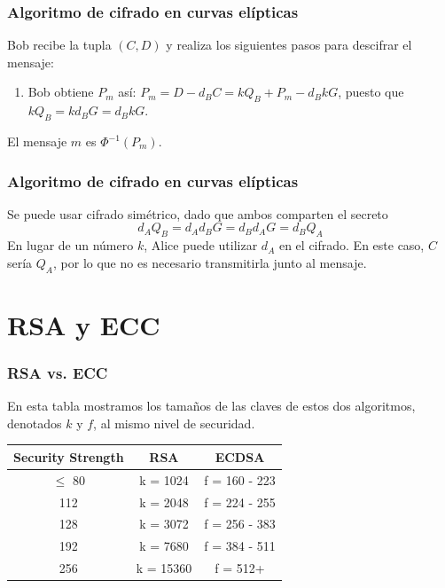 \documentclass[xcolor=x11names,compress,utf8, 9pt]{beamer}
\begin{document}
\begin{frame}\frametitle{Algoritmo de cifrado en curvas elípticas}
Bob recibe la tupla $(C,D)$ y realiza los siguientes pasos para descifrar el mensaje:

\begin{enumerate}
\item Bob obtiene $P_m$ así: $P_m = D - d_BC = kQ_B + P_m - d_BkG$,
puesto que $kQ_B=kd_BG=d_BkG$.
\end{enumerate}

El mensaje $m$ es $\Phi^{-1}(P_m)$.
\end{frame}

\begin{frame}\frametitle{Algoritmo de cifrado en curvas elípticas}
Se puede usar cifrado simétrico, dado que ambos comparten el secreto
$$d_A Q_B=d_A d_B G=d_B d_AG=d_B Q_A$$
En lugar de un número $k$, Alice puede utilizar $d_A$ en el cifrado. En este caso, $C$ sería $Q_A$, por lo que no es necesario transmitirla junto al mensaje.
\end{frame}

\section{RSA y ECC}

\begin{frame}\frametitle{RSA vs. ECC}

En esta tabla mostramos los tamaños de las claves de estos dos algoritmos, denotados $k$ y $f$, al mismo nivel de securidad.
  
  \begin{table}[H]
\centering
\begin{tabular}{|c|c|c|}
\hline
\textbf{Security Strength} & \textbf{RSA} & \textbf{ECDSA} \\ \hline
$\leq$ 80                  & k = 1024       & f = 160 - 223  \\
112                        & k = 2048     & f = 224 - 255  \\
128                        & k = 3072     & f = 256 - 383  \\
192                        & k = 7680     & f = 384 - 511  \\
256                        & k = 15360    & f = 512+       \\ \hline
\end{tabular}
\end{table}

\end{frame}
\end{document}
